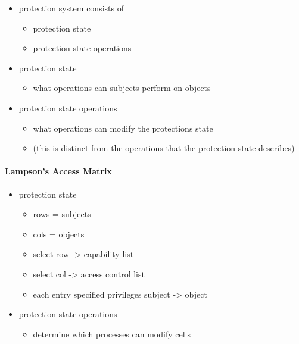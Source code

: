 \documentclass[
  12pt]{findlay}
\providecommand{\tightlist}{%
  \setlength{\itemsep}{0pt}\setlength{\parskip}{0pt}}
\begin{document}
\begin{itemize}
\tightlist
\item
  protection system consists of

  \begin{itemize}
  \tightlist
  \item
    protection state
  \item
    protection state operations
  \end{itemize}
\item
  protection state

  \begin{itemize}
  \tightlist
  \item
    what operations can subjects perform on objects
  \end{itemize}
\item
  protection state operations

  \begin{itemize}
  \tightlist
  \item
    what operations can modify the protections state
  \item
    (this is distinct from the operations that the protection state
    describes)
  \end{itemize}
\end{itemize}

\hypertarget{lampsons-access-matrix}{%
\paragraph{Lampson's Access Matrix}\label{lampsons-access-matrix}}

\begin{itemize}
\tightlist
\item
  protection state

  \begin{itemize}
  \tightlist
  \item
    rows = subjects
  \item
    cols = objects
  \item
    select row -\textgreater{} capability list
  \item
    select col -\textgreater{} access control list
  \item
    each entry specified privileges subject -\textgreater{} object
  \end{itemize}
\item
  protection state operations

  \begin{itemize}
  \tightlist
  \item
    determine which processes can modify cells
  \end{itemize}
\end{itemize}
\end{document}
